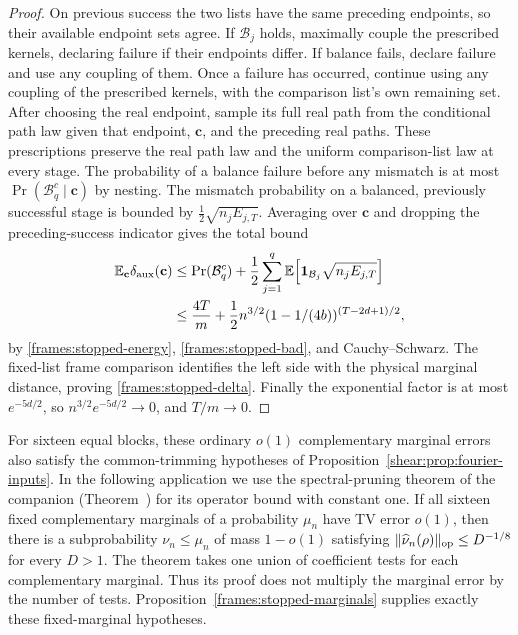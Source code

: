 \begin{proof}
On previous success the two lists have the same preceding endpoints,
so their available endpoint sets agree. If $\mathcal B_j$ holds,
maximally couple the prescribed kernels, declaring failure if their
endpoints differ. If balance fails, declare failure
and use any coupling of them. Once a failure has occurred, continue
using any coupling of the prescribed kernels, with the comparison
list's own remaining set. After choosing the real endpoint, sample its
full real path from the conditional path law given that endpoint,
$\mathbf c$, and the preceding real paths. These prescriptions preserve the
real path law and the uniform comparison-list law at every stage.
The probability of a balance failure before any mismatch is at most
$\Pr(\mathcal B_q^c\mid\mathbf c)$ by nesting. The mismatch probability on
a balanced, previously successful stage is bounded by
$\tfrac12\sqrt{n_jE_{j,T}}$. Averaging over $\mathbf c$ and dropping
the preceding-success indicator gives the total bound
\begin{align*}
 \mathbb E_{\mathbf c}\delta_{\rm aux}(\mathbf c)
 &\le \Pr(\mathcal B_q^c)
 +\frac12\sum_{j=1}^q
       \mathbb E\!\left[\mathbf1_{\mathcal B_j}
                         \sqrt{n_jE_{j,T}}\right]\\
 &\le\frac{4T}{m}
     +\frac12n^{3/2}(1-1/(4b))^{(T-2d+1)/2},
\end{align*}
by \eqref{frames:stopped-energy}, \eqref{frames:stopped-bad}, and
Cauchy--Schwarz. The fixed-list frame comparison identifies the left
side with the physical marginal distance, proving
\eqref{frames:stopped-delta}.
Finally the exponential factor is at most $e^{-5d/2}$, so
$n^{3/2}e^{-5d/2}\to0$, and $T/m\to0$.
\end{proof}

For sixteen equal blocks, these ordinary $o(1)$ complementary marginal
errors also satisfy the common-trimming hypotheses of
Proposition~\ref{shear:prop:fourier-inputs}. In the following application
we use the spectral-pruning theorem of the companion
(Theorem~) for its operator bound with constant
one. If all
sixteen fixed complementary marginals of a probability $\mu_n$ have
TV error $o(1)$, then there is a subprobability $\nu_n\le\mu_n$ of
mass $1-o(1)$ satisfying
$\|\widehat\nu_n(\rho)\|_{\rm op}\le D^{-1/8}$ for every $D>1$.
The theorem takes one union of coefficient tests for each complementary
marginal. Thus its proof does not multiply the marginal error by the
number of tests. Proposition~\ref{frames:stopped-marginals} supplies
exactly these fixed-marginal hypotheses.

